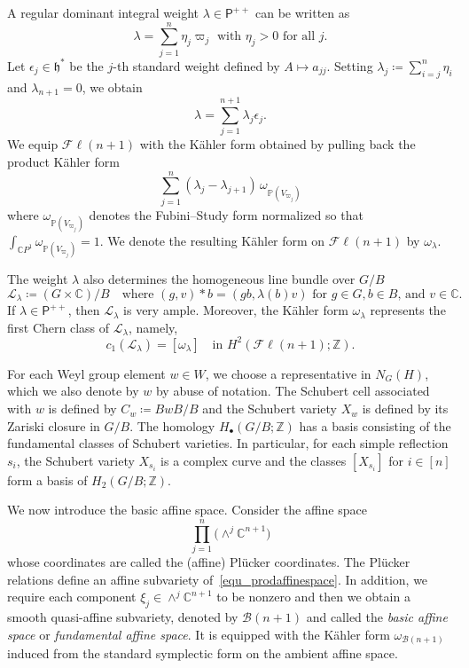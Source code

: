 \documentclass[11pt]{amsart}
\theoremstyle{plain}
\theoremstyle{definition}
\theoremstyle{remark}
\newcommand{\C}{\mathbb{C}}
\newcommand{\Z}{\mathbb{Z}}
\newcommand{\CP}{\mathbb{C}P}
\numberwithin{equation}{section} \numberwithin{table}{section}
\numberwithin{equation}{section}
\begin{document}
A regular dominant integral weight $\lambda \in \mathsf{P}^{++}$ can be written as
\begin{equation}\label{equ_lambdagiven}
\lambda = \sum_{j=1}^{n} \eta_j \varpi_j \mbox{ with $\eta_j > 0$ for all $j$.}
\end{equation}
Let $\epsilon_j \in \mathfrak{h}^*$ be the $j$-th standard weight defined by $A \mapsto a_{jj}$. 
Setting $\lambda_j \coloneqq \sum_{i=j}^{n} \eta_i$ and $\lambda_{n+1} = 0$, we obtain 
$$
\lambda = \sum_{j=1}^{n+1} \lambda_j  \epsilon_j.
$$
We equip $\mathcal{F}\ell(n+1)$ with the K\"{a}hler form obtained by pulling back the product K\"{a}hler form
\begin{equation}\label{equ_FubiniStudy}
\sum_{j=1}^n (\lambda_j - \lambda_{j+1}) \, \omega_{\mathbb{P}(V_{\varpi_j})}
\end{equation}
where $\omega_{\mathbb{P}(V_{\varpi_j})}$ denotes the Fubini--Study form normalized so that $\int_{\CP^1} \omega_{\mathbb{P}(V_{\varpi_j})} = 1$. We denote the resulting K\"{a}hler form on $\mathcal{F}\ell(n+1)$ by $\omega_\lambda$. 

The weight $\lambda$ also determines the homogeneous line bundle over $G/B$
$$
\mathcal{L}_\lambda \coloneqq (G \times \C) / B \quad \mbox{where } (g,v) * b = (gb, \lambda(b) v) \,\, \mbox{for $g \in G, b \in B$, and $v \in \C$}.
$$ 
If $\lambda  \in \mathsf{P}^{++}$, then $\mathcal{L}_\lambda$ is very ample. Moreover, the K\"{a}hler form $\omega_\lambda$ represents the first Chern class of $\mathcal{L}_\lambda$, namely, 
\begin{equation}\label{equ_c1w}
c_1(\mathcal{L}_\lambda) = [\omega_\lambda] \quad \mbox{in $H^2(\mathcal{F}\ell(n+1) ; \Z)$.}
\end{equation}

For each Weyl group element $w \in W$, we choose a representative in $N_G(H)$, which we also denote by $w$ by abuse of notation. The Schubert cell associated with $w$ is defined by $C_w \coloneqq B{w}B/B$ and the Schubert variety $X_{w}$ is defined by its Zariski closure in $G/B$. The homology $H_\bullet(G/B;\Z)$ has a basis consisting of the fundamental classes of Schubert varieties. In particular, for each simple reflection $s_i$, the Schubert variety $X_{s_i}$ is a complex curve and the classes $[X_{s_i}]$ for $i \in [n]$ form a basis of $H_2(G/B;\Z)$.

We now introduce the basic affine space. Consider the affine space 
\begin{equation}\label{equ_prodaffinespace}
\prod_{j=1}^n \bigl(\wedge^j \C^{n+1}\bigr)
\end{equation}
whose coordinates are called the (affine) Pl\"{u}cker coordinates. The Pl\"{u}cker relations define an affine subvariety of~\eqref{equ_prodaffinespace}. In addition, we require each component $\xi_j \in \wedge^j \C^{n+1}$ to be nonzero and then we obtain a smooth quasi-affine subvariety, denoted by $\mathcal{B}(n+1)$ and called the \emph{basic affine space} or \emph{fundamental affine space}. It is equipped with the K\"{a}hler form $\omega_{\mathcal{B}(n+1)}$ induced from the standard symplectic form on the ambient affine space. 
\end{document}
